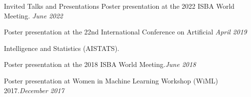 \documentclass{resume} %
\begin{document}
\begin{rSection}{Invited Talks and Presentations}
Poster presentation at the 2022 ISBA World Meeting. \hfill {\em June 2022}


Poster presentation at the 22nd International Conference on Artificial  \hfill {\em April 2019}

\vspace{-0.1in}
Intelligence and Statistics (AISTATS).



Poster presentation at the 2018 ISBA World Meeting.\hfill {\em June 2018}


Poster presentation at Women in Machine Learning Workshop (WiML) 2017.\hfill {\em December 2017}

\end{rSection}


\end{document}
